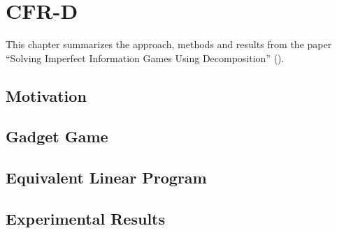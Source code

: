 \chapter{CFR-D}
\label{ch:cfr-d}
This chapter summarizes the approach, methods and results from the paper ``Solving Imperfect Information Games Using Decomposition'' (\cite{BurchJohansonBowling13}).

\section{Motivation}

\section{Gadget Game}

\section{Equivalent Linear Program}

\section{Experimental Results}
